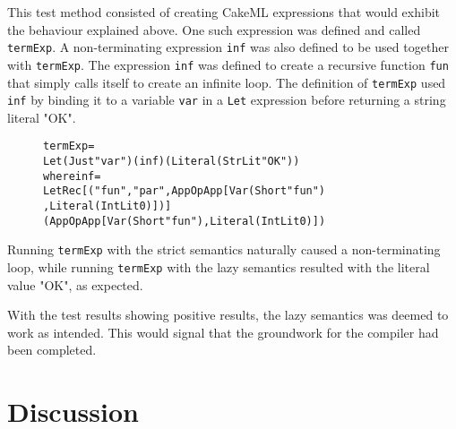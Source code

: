 This test method consisted of creating CakeML expressions that would exhibit the
behaviour explained above. One such expression was defined
and called \texttt{termExp}. A non-terminating expression \texttt{inf} was also
defined to be used together with \texttt{termExp}.
The expression
\texttt{inf} was defined to create a recursive function \texttt{fun}
that simply calls itself to create an infinite loop.
The definition of \texttt{termExp} used
\texttt{inf} by binding it to a variable \texttt{var} in a \texttt{Let}
expression before returning a string literal "OK".

\begin{figure}[H]
\begin{alltt}
  termExp =
    Let (Just "var") (inf) (Literal (StrLit "OK"))
    where inf =
      LetRec [("fun", "par", App OpApp [Var (Short "fun")
                                       ,Literal (IntLit 0)])]
      (App OpApp [Var (Short "fun"), Literal (IntLit 0)])
\end{alltt}
\end{figure}

\noindent Running \texttt{termExp} with the strict semantics naturally caused a
non-terminating loop, while running \texttt{termExp} with the lazy semantics
resulted with the literal value "OK", as expected.

With the test results showing positive results, the lazy semantics was deemed
to work as intended. This would signal that the groundwork for the compiler
had been completed.

\section{Discussion}


